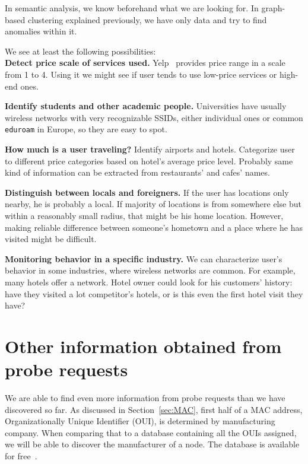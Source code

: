 \documentclass[12pt,a4paper,oneside,pdftex]{report}
\begin{document}
In semantic analysis, we know beforehand what we are looking for. In graph-based clustering explained previously, we have only data and try to find anomalies within it.

We see at least the following possibilities:\\

\textbf{Detect price scale of services used.} Yelp~\cite{yelp} provides price range in a scale from 1 to 4. Using it we might see if user tends to use low-price services or high-end ones.

\textbf{Identify students and other academic people.} Universities have usually wireless networks with very recognizable SSIDs, either individual ones or common \texttt{eduroam} in Europe, so they are easy to spot.

\textbf{How much is a user traveling?} Identify airports and hotels. Categorize user to different price categories based on hotel's average price level. Probably same kind of information can be extracted from restaurants' and cafes' names.

\textbf{Distinguish between locals and foreigners.} If the user has locations only nearby, he is probably a local. If majority of locations is from somewhere else but within a reasonably small radius, that might be his home location. However, making reliable difference between someone's hometown and a place where he has visited might be difficult.

\textbf{Monitoring behavior in a specific industry.} We can characterize user's behavior in some industries, where wireless networks are common. For example, many hotels offer a network. Hotel owner could look for his customers' history: have they visited a lot competitor's hotels, or is this even the first hotel visit they have? 

\section{Other information obtained from probe requests}
\label{sec:other_info}

We are able to find even more information from probe requests than we have discovered so far. As discussed in Section~\ref{sec:MAC}, first half of a MAC address, Organizationally Unique Identifier (OUI), is determined by manufacturing company. When comparing that to a database containing all the OUIs assigned, we will be able to discover the manufacturer of a node. The database is available for free~\cite{oui_listing}.
\end{document}
